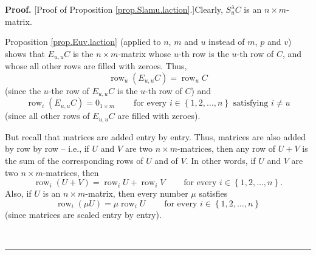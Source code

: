\documentclass[numbers=enddot,12pt,final,onecolumn,notitlepage]{scrartcl}%
\theoremstyle{definition}
\newenvironment{proof}[1][Proof]{\noindent\textbf{#1.} }{\ \rule{0.5em}{0.5em}}
\begin{document}
\begin{proof}
[Proof of Proposition \ref{prop.Slamu.laction}.]Clearly, $S_{u}^{\lambda}C$ is
an $n\times m$-matrix.

Proposition \ref{prop.Euv.laction} (applied to $n$, $m$ and $u$ instead of
$m$, $p$ and $v$) shows that $E_{u,u}C$ is the $n\times m$-matrix whose $u$-th
row is the $u$-th row of $C$, and whose all other rows are filled with zeroes.
Thus,%
\begin{equation}
\operatorname*{row}\nolimits_{u}\left(  E_{u,u}C\right)  =\operatorname*{row}%
\nolimits_{u}C \label{pf.prop.Slamu.laction.1}%
\end{equation}
(since the $u$-the row of $E_{u,u}C$ is the $u$-th row of $C$) and%
\begin{equation}
\operatorname*{row}\nolimits_{i}\left(  E_{u,u}C\right)  =0_{1\times
m}\ \ \ \ \ \ \ \ \ \ \text{for every }i\in\left\{  1,2,\ldots,n\right\}
\text{ satisfying }i\neq u \label{pf.prop.Slamu.laction.2}%
\end{equation}
(since all other rows of $E_{u,u}C$ are filled with zeroes).

But recall that matrices are added entry by entry. Thus, matrices are also
added by row by row -- i.e., if $U$ and $V$ are two $n\times m$-matrices, then
any row of $U+V$ is the sum of the corresponding rows of $U$ and of $V$. In
other words, if $U$ and $V$ are two $n\times m$-matrices, then%
\begin{equation}
\operatorname*{row}\nolimits_{i}\left(  U+V\right)  =\operatorname*{row}%
\nolimits_{i}U+\operatorname*{row}\nolimits_{i}V\ \ \ \ \ \ \ \ \ \ \text{for
every }i\in\left\{  1,2,\ldots,n\right\}  . \label{pf.prop.Slamu.laction.5}%
\end{equation}
Also, if $U$ is an $n\times m$-matrix, then every number $\mu$ satisfies%
\begin{equation}
\operatorname*{row}\nolimits_{i}\left(  \mu U\right)  =\mu\operatorname*{row}%
\nolimits_{i}U\ \ \ \ \ \ \ \ \ \ \text{for every }i\in\left\{  1,2,\ldots
,n\right\}  \label{pf.prop.Slamu.laction.6}%
\end{equation}
(since matrices are scaled entry by entry).


\end{proof}
\end{document}

